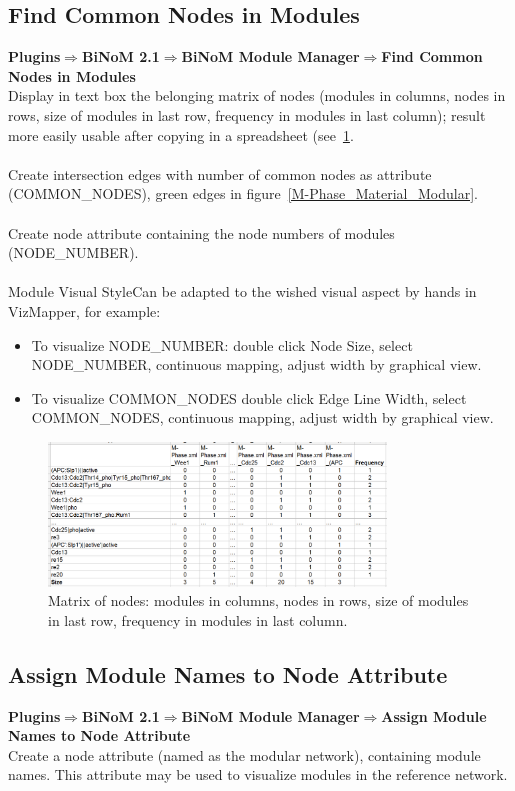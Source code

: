\subsection{Find Common Nodes in Modules}
\textbf{Plugins$\Rightarrow$BiNoM 2.1$\Rightarrow$BiNoM Module Manager$\Rightarrow$Find Common Nodes in Modules}\\
Display in text box the belonging matrix of nodes (modules in columns, nodes in rows, size of modules in last row, frequency in modules in last column); result more easily usable after copying in a spreadsheet (see~\ref{Common_nodes_in_modules}.\\\\
Create intersection edges with number of common nodes as attribute (COMMON\_NODES), green edges in figure~\ref{M-Phase_Material_Modular}.\\\\
Create node attribute containing the node numbers of modules (NODE\_NUMBER).\\\\
Module Visual StyleCan be adapted to the wished visual aspect by hands in VizMapper, for example:
\begin{itemize}
\item To visualize NODE\_NUMBER: double click Node Size, select NODE\_NUMBER, continuous mapping, adjust width by graphical view.
\item To visualize COMMON\_NODES double click Edge Line Width, select COMMON\_NODES, continuous mapping, adjust width by graphical view.
\end{itemize}
\begin{figure}
\centering
\includegraphics[width=0.8\textwidth]{graphics/Common_nodes_in_modules}
\caption{Matrix of nodes: modules in columns, nodes in rows, size of modules in last row, frequency in modules in last column.}
\label{Common_nodes_in_modules}
\end{figure}

\subsection{Assign Module Names to Node Attribute}
\textbf{Plugins$\Rightarrow$BiNoM 2.1$\Rightarrow$BiNoM Module Manager$\Rightarrow$Assign Module Names to Node Attribute}\\
Create a node attribute (named as the modular network), containing module names. This attribute may be used to visualize modules in the reference network.

